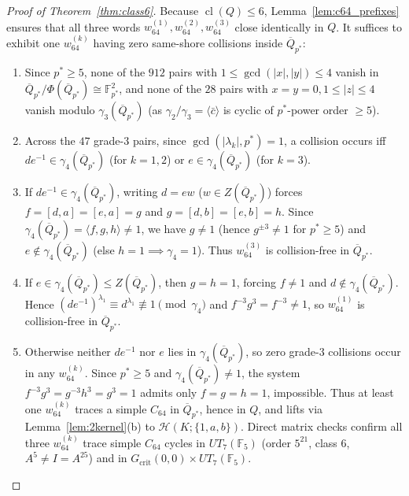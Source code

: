\documentclass[11pt]{amsart}
\theoremstyle{definition}
\theoremstyle{remark}
\newcommand{\F}{\mathbb{F}}
\newcommand{\Haar}{\mathcal{H}}
\newcommand{\cl}{\operatorname{cl}}
\begin{document}
\begin{proof}[Proof of Theorem~\ref{thm:class6}]
Because $\cl(Q) \le 6$, Lemma~\ref{lem:c64_prefixes} ensures that all three words $w_{64}^{(1)}, w_{64}^{(2)}, w_{64}^{(3)}$ close identically in $Q$. It suffices to exhibit one $w_{64}^{(k)}$ having zero same-shore collisions inside $\overline{Q}_{p^*}$:
\begin{enumerate}[label=(\roman*)]
\item Since $p^* \ge 5$, none of the $912$ pairs with $1 \le \gcd(|x|,|y|) \le 4$ vanish in $\overline{Q}_{p^*}/\Phi(\overline{Q}_{p^*}) \cong \F_{p^*}^2$, and none of the $28$ pairs with $x=y=0, 1 \le |z| \le 4$ vanish modulo $\gamma_3(\overline{Q}_{p^*})$ (as $\gamma_2/\gamma_3 = \langle \bar{c}\rangle$ is cyclic of $p^*$-power order $\ge 5$).
\item Across the $47$ grade-$3$ pairs, since $\gcd(|\lambda_k|, p^*) = 1$, a collision occurs iff $d e^{-1} \in \gamma_4(\overline{Q}_{p^*})$ (for $k=1,2$) or $e \in \gamma_4(\overline{Q}_{p^*})$ (for $k=3$).
\item If $d e^{-1} \in \gamma_4(\overline{Q}_{p^*})$, writing $d = e w$ ($w \in Z(\overline{Q}_{p^*})$) forces $f = [d,a] = [e,a] = g$ and $g = [d,b] = [e,b] = h$. Since $\gamma_4(\overline{Q}_{p^*}) = \langle f,g,h\rangle \ne 1$, we have $g \ne 1$ (hence $g^{\pm 3} \ne 1$ for $p^* \ge 5$) and $e \notin \gamma_4(\overline{Q}_{p^*})$ (else $h = 1 \implies \gamma_4 = 1$). Thus $w_{64}^{(3)}$ is collision-free in $\overline{Q}_{p^*}$.
\item If $e \in \gamma_4(\overline{Q}_{p^*}) \le Z(\overline{Q}_{p^*})$, then $g = h = 1$, forcing $f \ne 1$ and $d \notin \gamma_4(\overline{Q}_{p^*})$. Hence $(d e^{-1})^{\lambda_1} \equiv d^{\lambda_1} \not\equiv 1 \pmod{\gamma_4}$ and $f^{-3} g^3 = f^{-3} \ne 1$, so $w_{64}^{(1)}$ is collision-free in $\overline{Q}_{p^*}$.
\item Otherwise neither $d e^{-1}$ nor $e$ lies in $\gamma_4(\overline{Q}_{p^*})$, so zero grade-$3$ collisions occur in any $w_{64}^{(k)}$. Since $p^* \ge 5$ and $\gamma_4(\overline{Q}_{p^*}) \ne 1$, the system $f^{-3} g^3 = g^{-3} h^3 = g^3 = 1$ admits only $f = g = h = 1$, impossible. Thus at least one $w_{64}^{(k)}$ traces a simple $C_{64}$ in $\overline{Q}_{p^*}$, hence in $Q$, and lifts via Lemma~\ref{lem:2kernel}(b) to $\Haar(K; \{1,a,b\})$. Direct matrix checks confirm all three $w_{64}^{(k)}$ trace simple $C_{64}$ cycles in $UT_7(\F_5)$ (order $5^{21}$, class $6$, $A^5 \ne I = A^{25}$) and in $G_{\mathrm{crit}}(0,0) \times UT_7(\F_5)$.
\end{enumerate}
\end{proof}
\end{document}
